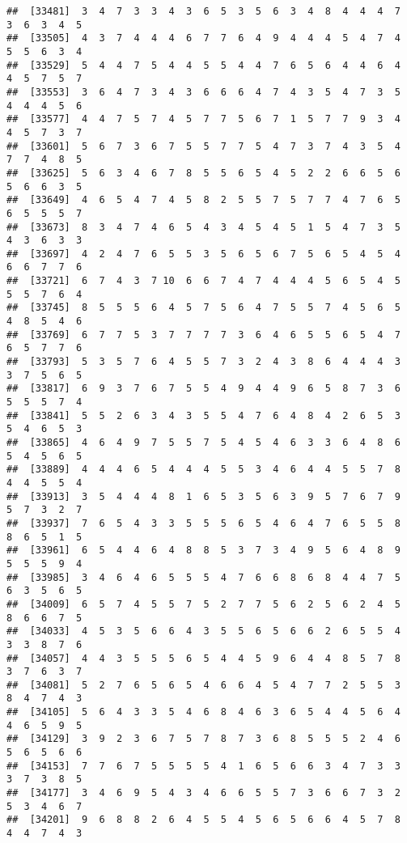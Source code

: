 \documentclass[
]{book}
\begin{document}
\begin{verbatim}
##  [33481]  3  4  7  3  3  4  3  6  5  3  5  6  3  4  8  4  4  4  7  3  6  3  4  5
##  [33505]  4  3  7  4  4  4  6  7  7  6  4  9  4  4  4  5  4  7  4  5  5  6  3  4
##  [33529]  5  4  4  7  5  4  4  5  5  4  4  7  6  5  6  4  4  6  4  4  5  7  5  7
##  [33553]  3  6  4  7  3  4  3  6  6  6  4  7  4  3  5  4  7  3  5  4  4  4  5  6
##  [33577]  4  4  7  5  7  4  5  7  7  5  6  7  1  5  7  7  9  3  4  4  5  7  3  7
##  [33601]  5  6  7  3  6  7  5  5  7  7  5  4  7  3  7  4  3  5  4  7  7  4  8  5
##  [33625]  5  6  3  4  6  7  8  5  5  6  5  4  5  2  2  6  6  5  6  5  6  6  3  5
##  [33649]  4  6  5  4  7  4  5  8  2  5  5  7  5  7  7  4  7  6  5  6  5  5  5  7
##  [33673]  8  3  4  7  4  6  5  4  3  4  5  4  5  1  5  4  7  3  5  4  3  6  3  3
##  [33697]  4  2  4  7  6  5  5  3  5  6  5  6  7  5  6  5  4  5  4  6  6  7  7  6
##  [33721]  6  7  4  3  7 10  6  6  7  4  7  4  4  4  5  6  5  4  5  5  5  7  6  4
##  [33745]  8  5  5  5  6  4  5  7  5  6  4  7  5  5  7  4  5  6  5  4  8  5  4  6
##  [33769]  6  7  7  5  3  7  7  7  7  3  6  4  6  5  5  6  5  4  7  6  5  7  7  6
##  [33793]  5  3  5  7  6  4  5  5  7  3  2  4  3  8  6  4  4  4  3  3  7  5  6  5
##  [33817]  6  9  3  7  6  7  5  5  4  9  4  4  9  6  5  8  7  3  6  5  5  5  7  4
##  [33841]  5  5  2  6  3  4  3  5  5  4  7  6  4  8  4  2  6  5  3  5  4  6  5  3
##  [33865]  4  6  4  9  7  5  5  7  5  4  5  4  6  3  3  6  4  8  6  5  4  5  6  5
##  [33889]  4  4  4  6  5  4  4  4  5  5  3  4  6  4  4  5  5  7  8  4  4  5  5  4
##  [33913]  3  5  4  4  4  8  1  6  5  3  5  6  3  9  5  7  6  7  9  5  7  3  2  7
##  [33937]  7  6  5  4  3  3  5  5  5  6  5  4  6  4  7  6  5  5  8  8  6  5  1  5
##  [33961]  6  5  4  4  6  4  8  8  5  3  7  3  4  9  5  6  4  8  9  5  5  5  9  4
##  [33985]  3  4  6  4  6  5  5  5  4  7  6  6  8  6  8  4  4  7  5  6  3  5  6  5
##  [34009]  6  5  7  4  5  5  7  5  2  7  7  5  6  2  5  6  2  4  5  8  6  6  7  5
##  [34033]  4  5  3  5  6  6  4  3  5  5  6  5  6  6  2  6  5  5  4  3  3  8  7  6
##  [34057]  4  4  3  5  5  5  6  5  4  4  5  9  6  4  4  8  5  7  8  3  7  6  3  7
##  [34081]  5  2  7  6  5  6  5  4  6  6  4  5  4  7  7  2  5  5  3  8  4  7  4  3
##  [34105]  5  6  4  3  3  5  4  6  8  4  6  3  6  5  4  4  5  6  4  4  6  5  9  5
##  [34129]  3  9  2  3  6  7  5  7  8  7  3  6  8  5  5  5  2  4  6  5  6  5  6  6
##  [34153]  7  7  6  7  5  5  5  5  4  1  6  5  6  6  3  4  7  3  3  3  7  3  8  5
##  [34177]  3  4  6  9  5  4  3  4  6  6  5  5  7  3  6  6  7  3  2  5  3  4  6  7
##  [34201]  9  6  8  8  2  6  4  5  5  4  5  6  5  6  6  4  5  7  8  4  4  7  4  3

\end{verbatim}
\end{document}
